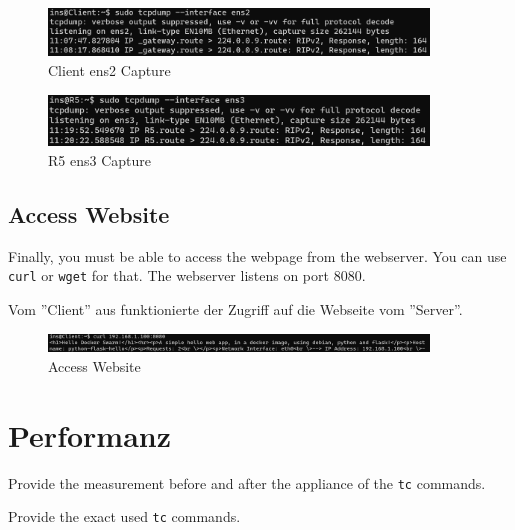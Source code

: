 \documentclass[11pt,titlepage]{article}
\newenvironment{shadedquotation}
 {\begin{shaded*}
  \quoting[leftmargin=0pt, vskip=0pt]
 }
 {\endquoting
 \end{shaded*}
}
\begin{document}
\begin{figure}[H]
	\begin{center}
		\includegraphics[width=0.90\textwidth]{"images/Client OSPF Capture"}
		\caption{Client ens2 Capture}
		\label{fig:client-OSPF-Capture}
	\end{center}
\end{figure}

\begin{figure}[H]
	\begin{center}
		\includegraphics[width=0.90\textwidth]{"images/R5 OSPF Capture"}
		\caption{R5 ens3 Capture}
		\label{fig:client-OSPF-Capture}
	\end{center}
\end{figure}


\subsection{Access Website}
\label{subsec:AccessWebsite}
\begin{shadedquotation}
  Finally, you must be able to access the webpage from the webserver. You can use \lstinline!curl! or \lstinline!wget! for that. The webserver listens on port 8080.
\end{shadedquotation}
Vom ''Client'' aus funktionierte der Zugriff auf die Webseite vom ''Server''.
\begin{figure}[H]
	\begin{center}
		\includegraphics[width=0.90\textwidth]{"images/Verifikation Access Website"}
		\caption{Access Website}
		\label{fig:verifikation-access-website}
	\end{center}
\end{figure}

\section{Performanz}
\label{sec:Performanz}
\begin{shadedquotation}
  Provide the measurement before and after the appliance of the \lstinline!tc! commands.
  
  Provide the exact used \lstinline!tc! commands.
\end{shadedquotation}
\end{document}
